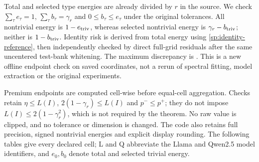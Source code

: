 Total and selected type energies are already divided by $r$ in the source. We check $\sum_\tau e_\tau=1$, $\sum_\tau b_\tau=\gamma_r$ and $0\le b_\tau\le e_\tau$ under the original tolerances. All nontrivial energy is $1-e_{\rm triv}$, whereas selected nontrivial energy is $\gamma_r-b_{\rm triv}$; neither is $1-b_{\rm triv}$. Identity risk is derived from total energy using \cref{sp:identity-reference}, then independently checked by direct full-grid residuals after the same uncentered test-bank whitening. The maximum discrepancy is \BoundedIdentityMaxError. This is a new offline endpoint check on saved coordinates, not a rerun of spectral fitting, model extraction or the original experiments.

Premium endpoints are computed cell-wise before equal-cell aggregation. Checks retain $\eta\le L(I)$, $2(1-\gamma_r)\le L(I)$ and $p^-\le p^+$; they do not impose $L(I)\le2(1-\gamma_r^2)$, which is not required by the theorem. No raw value is clipped, and no tolerance or dimension is changed. The code also retains full precision, signed nontrivial energies and explicit display rounding. The following tables give every declared cell; L and Q abbreviate the Llama and Qwen2.5 model identifiers, and $e_0,b_0$ denote total and selected trivial energy.

\begin{table}[p]
\centering\small\setlength{\tabcolsep}{3pt}

\caption{C7 same-bank references and premium endpoints, all \BoundedCellsPerDomain{} fixed cells. $L(I)$ is the identity-action risk, not the loss for the identity group element alone.}
\label{tab:bounded-cell-risk-c7}
\end{table}
\begin{table}[p]
\centering\small\setlength{\tabcolsep}{3pt}

\caption{D4 same-bank references and premium endpoints, all \BoundedCellsPerDomain{} fixed cells. No family or model resampling enters these quantities.}
\label{tab:bounded-cell-risk-d4}
\end{table}
\begin{table}[p]
\centering\small\setlength{\tabcolsep}{3pt}

\caption{C7 total/selected type-energy pairs $e_\tau/b_\tau$. Complete real rotation planes are retained in the budget; total energy and selected energy are distinct.}
\label{tab:bounded-cell-types-c7}
\end{table}
\begin{table}[p]
\centering\small\setlength{\tabcolsep}{3pt}

\caption{D4 total/selected type-energy pairs $e_\tau/b_\tau$. The corner action has only four states; absent types retain their recorded machine-scale values in the CSV, rounded here for display.}
\label{tab:bounded-cell-types-d4}
\end{table}

